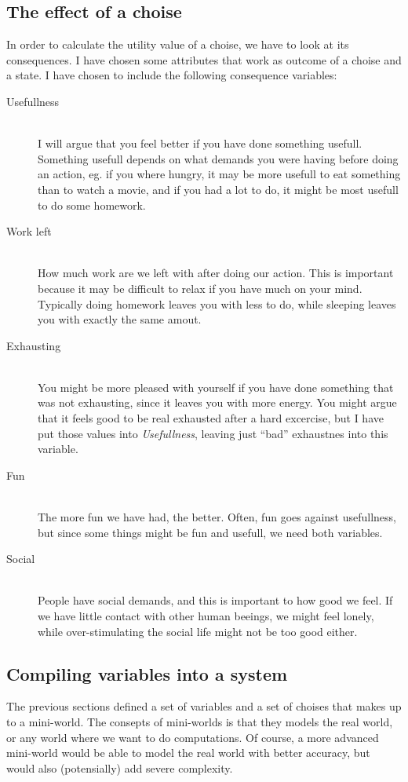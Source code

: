 \subsection{The effect of a choise}
In order to calculate the utility value of a choise, we have to
look at its consequences. I have chosen some attributes that work as outcome of a choise and
a state. I have chosen to include the following consequence variables:
\begin{description}
\item[Usefullness] \hfill\\
I will argue that you feel better if you have done something usefull. Something
usefull depends on what demands you were having before doing an action, eg. if
you where hungry, it may be more usefull to eat something than to watch a movie,
and if you had a lot to do, it might be most usefull to do some homework.

\item[Work left] \hfill\\
How much work are we left with after doing our action. This is important because
it may be difficult to relax if you have much on your mind. Typically doing
homework leaves you with less to do, while sleeping leaves you with exactly the
same amout.

\item[Exhausting] \hfill\\
You might be more pleased with yourself if you have done something that was not
exhausting, since it leaves you with more energy. You might argue that it feels
good to be real exhausted after a hard excercise, but I have put those values
into \emph{Usefullness}, leaving just ``bad'' exhaustnes into this variable.

\item[Fun] \hfill\\
The more fun we have had, the better. Often, fun goes against usefullness, but
since some things might be fun and usefull, we need both variables.

\item[Social] \hfill\\
People have social demands, and this is important to how good we feel. If we
have little contact with other human beeings, we might feel lonely, while
over-stimulating the social life might not be too good either. 

\end{description}

\subsection{Compiling variables into a system}
The previous sections defined a set of variables and a set of choises that
makes up to a mini-world. The consepts of mini-worlds is that
they models the real world, or any world where we want to do computations. Of course, a more
advanced mini-world would be able to model the real world with better accuracy,
but would also (potensially) add severe complexity.

